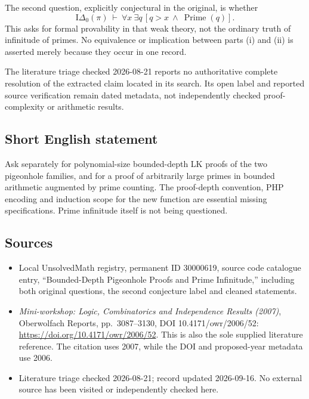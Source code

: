 \documentclass[11pt]{article}
\begin{document}
The second question, explicitly conjectural in the original, is whether
\[
 \mathrm I\Delta_0(\pi)\ \vdash\
 \forall x\ \exists q\,[q>x\ \wedge\ \operatorname{Prime}(q)].
\]
This asks for formal provability in that weak theory, not the ordinary truth of infinitude of primes. No equivalence or implication between parts (i) and (ii) is asserted merely because they occur in one record.

The literature triage checked 2026-08-21 reports no authoritative complete resolution of the extracted claim located in its search. Its open label and reported source verification remain dated metadata, not independently checked proof-complexity or arithmetic results.
\subsection{Short English statement}
Ask separately for polynomial-size bounded-depth LK proofs of the two pigeonhole families, and for a proof of arbitrarily large primes in bounded arithmetic augmented by prime counting. The proof-depth convention, PHP encoding and induction scope for the new function are essential missing specifications. Prime infinitude itself is not being questioned.
\subsection{Sources}
\begin{itemize}
\item Local UnsolvedMath registry, permanent ID 30000619, source code catalogue entry, ``Bounded-Depth Pigeonhole Proofs and Prime Infinitude,'' including both original questions, the second conjecture label and cleaned statements.
\item \emph{Mini-workshop: Logic, Combinatorics and Independence Results (2007)}, Oberwolfach Reports, pp.\ 3087--3130, DOI 10.4171/owr/2006/52: \url{https://doi.org/10.4171/owr/2006/52}. This is also the sole supplied literature reference. The citation uses 2007, while the DOI and proposed-year metadata use 2006.
\item Literature triage checked 2026-08-21; record updated 2026-09-16. No external source has been visited or independently checked here.
\end{itemize}
\end{document}
